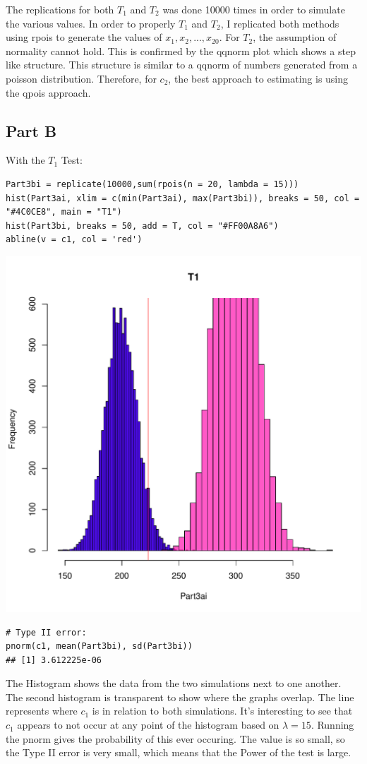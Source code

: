 \documentclass{article}\usepackage[]{graphicx}\usepackage[]{color}
\makeatletter
\newenvironment{kframe}{%
 \def\at@end@of@kframe{}%
 \ifinner\ifhmode%
  \def\at@end@of@kframe{\end{minipage}}%
  \begin{minipage}{\columnwidth}%
 \fi\fi%
 \def\FrameCommand##1{\hskip\@totalleftmargin \hskip-\fboxsep
 \colorbox{shadecolor}{##1}\hskip-\fboxsep
     \hskip-\linewidth \hskip-\@totalleftmargin \hskip\columnwidth}%
 \MakeFramed {\advance\hsize-\width
   \@totalleftmargin\z@ \linewidth\hsize
   \@setminipage}}%
 {\par\unskip\endMakeFramed%
 \at@end@of@kframe}
\newenvironment{knitrout}{}{} %
\makeatother
\begin{document}
The replications for both $T_{1}$ and $T_{2}$ was done 10000 times in order to simulate the various values. In order to properly $T_{1}$ and $T_{2}$, I replicated both methods using rpois to generate the values of $x_1, x_2,...,x_{20}$. For $T_{2}$, the assumption of normality cannot hold. This is confirmed by the qqnorm plot which shows a step like structure. This structure is similar to a qqnorm of numbers generated from a poisson distribution. Therefore, for $c_{2}$, the best approach to estimating is using the qpois approach.           
\subsection*{Part B}
With the $T_{1}$ Test:
\begin{knitrout}
\color{fgcolor}\begin{kframe}
\begin{verbatim}
Part3bi = replicate(10000,sum(rpois(n = 20, lambda = 15)))
hist(Part3ai, xlim = c(min(Part3ai), max(Part3bi)), breaks = 50, col = "#4C0CE8", main = "T1")
hist(Part3bi, breaks = 50, add = T, col = "#FF00A8A6")
abline(v = c1, col = 'red')
\end{verbatim}
\end{kframe}
\includegraphics[width=0.33\linewidth]{figure/unnamed-chunk-8-1} 
\begin{kframe}\begin{verbatim}
# Type II error:
pnorm(c1, mean(Part3bi), sd(Part3bi))
## [1] 3.612225e-06
\end{verbatim}
\end{kframe}
\end{knitrout}
The Histogram shows the data from the two simulations next to one another. The second histogram is transparent to show where the graphs overlap. The line represents where $c_1$ is in relation to both simulations. It's interesting to see that $c_1$ appears to not occur at any point of the histogram based on $\lambda = 15$. Running the pnorm gives the probability of this ever occuring. The value is so small, so the Type II error is very small, which means that the Power of the test is large.  
\end{document}

